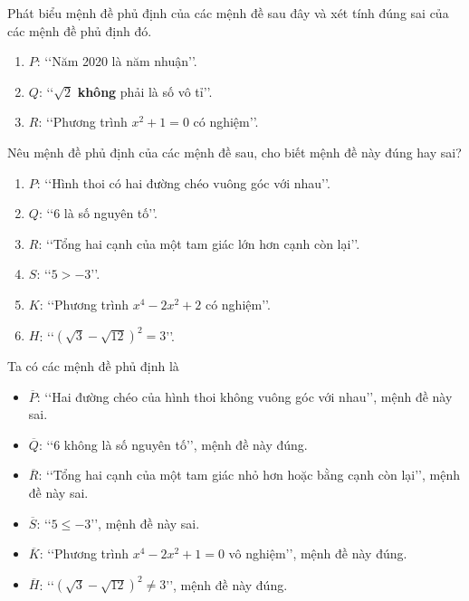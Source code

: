 \begin{bt}%
	Phát biểu mệnh đề phủ định của các mệnh đề sau đây và xét tính đúng sai của các mệnh đề phủ định đó.
	\begin{enumerate}
		\item $P$: \lq\lq Năm 2020 là năm nhuận\rq\rq.
		\item  $Q$: \lq\lq$\sqrt{2}$ \textbf{không} phải là số vô tỉ\rq\rq.
		\item  $R$: \lq\lq Phương trình $x^2+1=0$ có nghiệm\rq\rq.
	\end{enumerate}
\end{bt}

\begin{bt}%
	Nêu mệnh đề phủ định của các mệnh đề sau, cho biết mệnh đề này đúng hay sai?
	\begin{enumerate}
		\item $P$: \lq\lq Hình thoi có hai đường chéo vuông góc với nhau\rq\rq.
		\item $Q$: \lq\lq 6 là số nguyên tố\rq\rq.
		\item $R$: \lq\lq Tổng hai cạnh của một tam giác lớn hơn cạnh còn lại\rq\rq.
		\item $S$: \lq\lq $ 5>-3$\rq\rq.
		\item $K$: \lq\lq Phương trình $ x^4-2x^2+2 $ có nghiệm\rq\rq.
		\item $H$: \lq\lq $ (\sqrt{3}-\sqrt{12})^2=3$\rq\rq.
	\end{enumerate}
	\loigiai
	{Ta có các mệnh đề phủ định là
		\begin{itemize}
			\item $\overline{P}$: \lq\lq Hai đường chéo của hình thoi không vuông góc với nhau\rq\rq, mệnh đề này sai.
			\item $\overline{Q}$: \lq\lq 6 không là số nguyên tố\rq\rq, mệnh đề này đúng.
			\item $\overline{R}$: \lq\lq Tổng hai cạnh của một tam giác nhỏ hơn hoặc bằng cạnh còn lại\rq\rq, mệnh đề này sai.
			\item $\overline{S}$: \lq\lq $ 5\le -3 $\rq\rq, mệnh đề này sai.
			\item $\overline{K}$: \lq\lq Phương trình $x^4-2x^2+1=0$ vô nghiệm\rq\rq, mệnh đề này đúng.
			\item $\overline{H}$: \lq\lq $ (\sqrt{3}-\sqrt{12})^2\ne3$\rq\rq, mệnh đề này đúng.
		\end{itemize}
		
	}
\end{bt}

